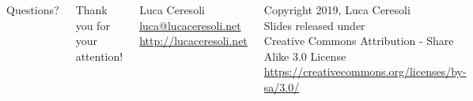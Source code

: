 \documentclass[xetex,table,aspectratio=169]{beamer}
\begin{document}
\begin{frame}
  \begin{columns}
    \center

    {\Huge Questions?}

    \center

    {\Large Thank you for your attention!}

    \vspace{0.15\textheight}

    {\Large Luca Ceresoli}\\
    \href{mailto:luca@lucaceresoli.net}{luca@lucaceresoli.net}\\
    \url{http://lucaceresoli.net}

    \vspace{0.05\textheight}

    \tiny
    \textcopyright{} Copyright 2019, Luca Ceresoli\\
    Slides released under\\
    Creative Commons Attribution - Share Alike 3.0 License \\
    \url{https://creativecommons.org/licenses/by-sa/3.0/} \\
\end{columns}
\end{frame}
\end{document}
